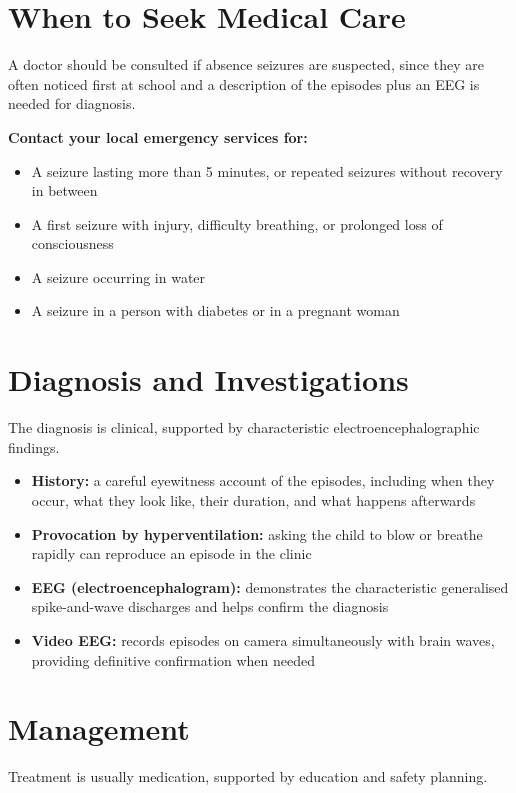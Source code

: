 \section*{When to Seek Medical Care}
A doctor should be consulted if absence seizures are suspected, since they are often noticed first at school and a description of the episodes plus an EEG is needed for diagnosis.

\textbf{Contact your local emergency services for:}
\begin{itemize}
    \item A seizure lasting more than 5 minutes, or repeated seizures without recovery in between
    \item A first seizure with injury, difficulty breathing, or prolonged loss of consciousness
    \item A seizure occurring in water
    \item A seizure in a person with diabetes or in a pregnant woman
\end{itemize}

\section*{Diagnosis and Investigations}
The diagnosis is clinical, supported by characteristic electroencephalographic findings.

\begin{itemize}
    \item \textbf{History:} a careful eyewitness account of the episodes, including when they occur, what they look like, their duration, and what happens afterwards
    \item \textbf{Provocation by hyperventilation:} asking the child to blow or breathe rapidly can reproduce an episode in the clinic
    \item \textbf{EEG (electroencephalogram):} demonstrates the characteristic generalised spike-and-wave discharges and helps confirm the diagnosis
    \item \textbf{Video EEG:} records episodes on camera simultaneously with brain waves, providing definitive confirmation when needed
\end{itemize}

\section*{Management}
Treatment is usually medication, supported by education and safety planning.

